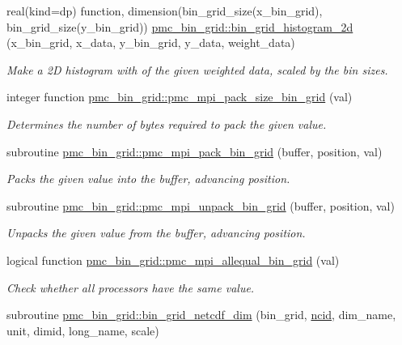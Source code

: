 \begin{DoxyCompactItemize}
real(kind=dp) function, dimension(bin\+\_\+grid\+\_\+size(x\+\_\+bin\+\_\+grid), bin\+\_\+grid\+\_\+size(y\+\_\+bin\+\_\+grid)) \mbox{\hyperlink{namespacepmc__bin__grid_aca186db5214b8baadd1dd1dae1be5d98}{pmc\+\_\+bin\+\_\+grid\+::bin\+\_\+grid\+\_\+histogram\+\_\+2d}} (x\+\_\+bin\+\_\+grid, x\+\_\+data, y\+\_\+bin\+\_\+grid, y\+\_\+data, weight\+\_\+data)
\begin{DoxyCompactList}\small\item\em Make a 2D histogram with of the given weighted data, scaled by the bin sizes. \end{DoxyCompactList}\item 
integer function \mbox{\hyperlink{namespacepmc__bin__grid_af316422f9bd046e6172d94efcea4a84f}{pmc\+\_\+bin\+\_\+grid\+::pmc\+\_\+mpi\+\_\+pack\+\_\+size\+\_\+bin\+\_\+grid}} (val)
\begin{DoxyCompactList}\small\item\em Determines the number of bytes required to pack the given value. \end{DoxyCompactList}\item 
subroutine \mbox{\hyperlink{namespacepmc__bin__grid_a83f71861916da3f47f6baac24cf45010}{pmc\+\_\+bin\+\_\+grid\+::pmc\+\_\+mpi\+\_\+pack\+\_\+bin\+\_\+grid}} (buffer, position, val)
\begin{DoxyCompactList}\small\item\em Packs the given value into the buffer, advancing position. \end{DoxyCompactList}\item 
subroutine \mbox{\hyperlink{namespacepmc__bin__grid_a0cc8644ef392c33e58b296f03899f5f5}{pmc\+\_\+bin\+\_\+grid\+::pmc\+\_\+mpi\+\_\+unpack\+\_\+bin\+\_\+grid}} (buffer, position, val)
\begin{DoxyCompactList}\small\item\em Unpacks the given value from the buffer, advancing position. \end{DoxyCompactList}\item 
logical function \mbox{\hyperlink{namespacepmc__bin__grid_a7a3956cc26b9ca8736fb65b47a1f8b67}{pmc\+\_\+bin\+\_\+grid\+::pmc\+\_\+mpi\+\_\+allequal\+\_\+bin\+\_\+grid}} (val)
\begin{DoxyCompactList}\small\item\em Check whether all processors have the same value. \end{DoxyCompactList}\item 
subroutine \mbox{\hyperlink{namespacepmc__bin__grid_a1e67dd0b3773b15d0d5523887106bcb1}{pmc\+\_\+bin\+\_\+grid\+::bin\+\_\+grid\+\_\+netcdf\+\_\+dim}} (bin\+\_\+grid, \mbox{\hyperlink{fractal_8_f90_a4e89f3f850921ff84a6dfce8b166ad50}{ncid}}, dim\+\_\+name, unit, dimid, long\+\_\+name, scale)

\end{DoxyCompactItemize}
